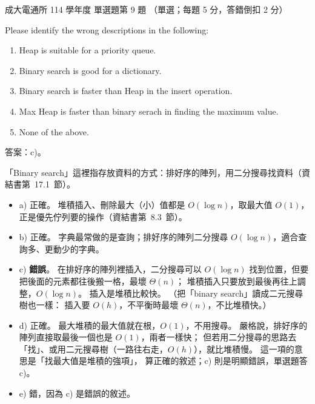 \begin{pastexam}[label={px:ncku-114-cce-ds-09}]{成大電通所 114 學年度 單選題第 9 題}
（單選；每題 5 分，答錯倒扣 2 分）

Please identify the wrong descriptions in the following:
\begin{enumerate}[label=\alph*),nosep]
\item Heap is suitable for a priority queue.
\item Binary search is good for a dictionary.
\item Binary search is faster than Heap in the insert operation.
\item Max Heap is faster than binary serach in finding the maximum value.
\item None of the above.
\end{enumerate}
\end{pastexam}

\begin{pastsoln}
答案：c)。

「Binary search」這裡指存放資料的方式：排好序的陣列，用二分搜尋找資料（資結書第~17.1~節）。
\begin{itemize}
\item a) 正確。 堆積插入、刪除最大（小）值都是 $O(\log n)$，取最大值 $O(1)$，正是優先佇列要的操作（資結書第~8.3~節）。
\item b) 正確。 字典最常做的是查詢；排好序的陣列二分搜尋 $O(\log n)$，適合查詢多、更動少的字典。
\item c) \textbf{錯誤}。 在排好序的陣列裡插入，二分搜尋可以 $O(\log n)$ 找到位置，但要把後面的元素都往後搬一格，最壞 $\Theta(n)$；
堆積插入只要放到最後再往上調整，$O(\log n)$。 插入是堆積比較快。 （把「binary search」讀成二元搜尋樹也一樣：
插入要 $O(h)$，不平衡時最壞 $\Theta(n)$，不比堆積快。）
\item d) 正確。 最大堆積的最大值就在根，$O(1)$，不用搜尋。 嚴格說，排好序的陣列直接取最後一個也是 $O(1)$，兩者一樣快；
但若用二分搜尋的思路去「找」、或用二元搜尋樹（一路往右走，$O(h)$），就比堆積慢。 這一項的意思是「找最大值是堆積的強項」，
算正確的敘述；c) 則是明顯錯誤，單選題答 c)。
\item e) 錯，因為 c) 是錯誤的敘述。
\end{itemize}
\end{pastsoln}

